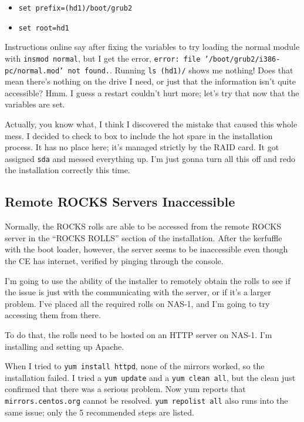 \documentclass[12pt]{article}
\begin{document}
\begin{itemize}
  \item {\tt set prefix=(hd1)/boot/grub2}
  \item {\tt set root=hd1}
\end{itemize}

\qq Instructions online say after fixing the variables to try loading the normal
module with {\tt insmod normal}, but I get the error, {\tt error: file
  '/boot/grub2/i386-pc/normal.mod' not found.}. Running {\tt ls (hd1)/} shows me
nothing! Does that mean there's nothing on the drive I need, or just that the
information isn't quite accessible? Hmm. I guess a restart couldn't hurt more;
let's try that now that the variables are set.

\qq Actually, you know what, I think I discovered the mistake that caused this
whole mess. I decided to check to box to include the hot spare in the
installation process. It has no place here; it's managed strictly by the RAID
card. It got assigned {\tt sda} and messed everything up. I'm just gonna turn all
this off and redo the installation correctly this time.

\subsection{Remote ROCKS Servers Inaccessible}

\qq Normally, the ROCKS rolls are able to be accessed from the remote ROCKS
server in the ``ROCKS ROLLS'' section of the installation. After the kerfuffle
with the boot loader, however, the server seems to be inaccessible even though
the CE has internet, verified by pinging through the console.

\qq I'm going to use the ability of the installer to remotely obtain the rolls
to see if the issue is just with the communicating with the server, or if it's a
larger problem. I've placed all the required rolls on NAS-1, and I'm going to
try accessing them from there.

\qq To do that, the rolls need to be hosted on an HTTP server on NAS-1. I'm
installing and setting up Apache.

\qq When I tried to {\tt yum install httpd}, none of the mirrors worked, so the
installation failed. I tried a {\tt yum update} and a {\tt yum clean all}, but the
clean just confirmed that there was a serious problem. Now yum reports that
{\tt mirrors.centos.org} cannot be resolved. {\tt yum repolist all} also runs into
the same issue; only the 5 recommended steps are listed. 
\end{document}
